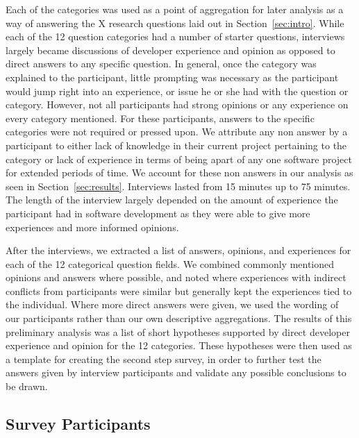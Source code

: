 \documentclass[conference]{IEEEtran}
\begin{document}
Each of the categories was used as a
point of aggregation for later analysis as a way of answering the X research questions laid out in 
Section~\ref{sec:intro}. While each of the 12 question categories had a number of starter questions, interviews 
largely became discussions of developer experience and opinion as opposed to direct answers to any specific question.
In general, once the category was explained to the participant, little prompting was necessary as the participant
would jump right into an experience, or issue he or she had with the question or category. However, not all
participants had strong opinions or any experience on every category mentioned. For these participants, answers 
to the specific categories were not required or pressed upon. We attribute any non answer by a participant to
either lack of knowledge in their current project pertaining to the category or lack of experience in terms of
being apart of any one software project for extended periods of time. We account for these non answers
in our analysis as seen in Section~\ref{sec:results}. Interviews lasted 
from 15 minutes up to 75 minutes. The length of the interview largely depended on the amount of experience the
participant had in software development as they were able to give more experiences and more informed opinions.

After the interviews, we extracted a list of answers, opinions, and experiences for each of the 12 categorical
question fields. We combined commonly mentioned opinions and answers where possible, and noted where experiences
with indirect conflicts from participants were similar but generally kept the experiences tied to the individual.
Where more direct answers were given, we used the wording of our participants rather than our own descriptive 
aggregations. The results of this preliminary analysis was a list of short hypotheses supported by direct developer
experience and opinion for the 12 categories. These hypotheses were then used as a template for creating the
second step survey, in order to further test the answers given by interview participants and validate any possible
conclusions to be drawn.

\subsection{Survey Participants}
\end{document}
